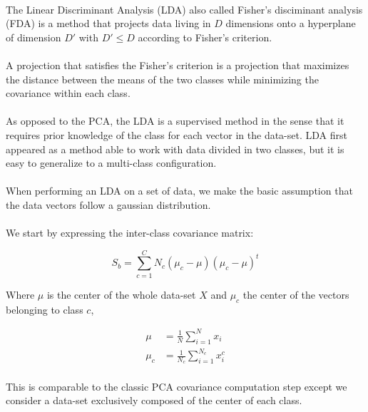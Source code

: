 
\paragraph{}
The Linear Discriminant Analysis (LDA) also called Fisher's disciminant analysis (FDA) is a method that projects data living in $D$ dimensions onto a hyperplane of dimension $D'$ with $D' \leq D$ according to Fisher's criterion. 

\paragraph{}
A projection that satisfies the Fisher's criterion is a projection that maximizes the distance between the means of the two classes while minimizing the covariance within each class.

\paragraph{}
As opposed to the PCA, the LDA is a supervised method in the sense that it requires prior
knowledge of the class for each vector in the data-set. LDA first appeared as a method able to work with data
divided in two classes, but it is easy to generalize to a multi-class configuration.

\paragraph{}
When performing an LDA on a set of data, we make the basic assumption that the data vectors follow a
gaussian distribution.

\paragraph{}
We start by expressing the inter-class covariance matrix:

\begin{equation*}
S_b = \sum_{c = 1}^C N_c(\mu_c - \mu)(\mu_c - \mu)^t
\end{equation*}

Where $\mu$ is the center of the whole data-set $X$ and $\mu_c$ the center of the vectors belonging to
class $c$,

\begin{align*}
\mu &= \frac{1}{N}\sum_{i = 1}^{N} x_i \\
\mu_c &= \frac{1}{N_c}\sum_{i = 1}^{N_c} x_i^c
\end{align*}

\paragraph{}
This is comparable to the classic PCA covariance computation step except we consider a data-set
exclusively composed of the center of each class.

